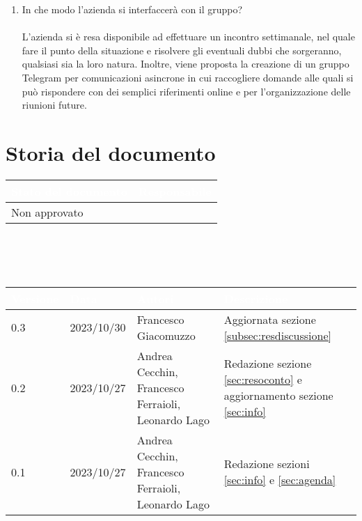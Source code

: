 \documentclass[12pt]{article}
\begin{document}
\begin{enumerate}
    \item In che modo l'azienda si interfaccerà con il gruppo?\\ \\
L'azienda si è resa disponibile ad effettuare un incontro settimanale, nel quale fare il punto della situazione e risolvere gli eventuali dubbi che sorgeranno, qualsiasi sia la loro natura. Inoltre, viene proposta la creazione di un gruppo Telegram per comunicazioni asincrone in cui raccogliere domande alle quali si può rispondere con dei semplici riferimenti online e per l'organizzazione delle riunioni future.

\end{enumerate}

\section{Storia del documento} \label{sec:storia}
\begingroup
\setlength{\tabcolsep}{10pt}
\renewcommand{\arraystretch}{1.5}
\begin{tabularx}{\textwidth}{| X | X |}
    \hline
    \rowcolor{headerrow} \textbf{\textcolor{white}{Stato del documento}} & \textbf{\textcolor{white}{Responsabile}} \\
    \hline
    Non approvato &\\
    \hline   
\end{tabularx}
\\\\\\
\begin{tabularx}{\textwidth}{| l | l | X | X |}
    \hline
    \rowcolor{headerrow} \textbf{\textcolor{white}{Versione}} & \textbf{\textcolor{white}{Data}} & \textbf{\textcolor{white}{Autori}} & \textbf{\textcolor{white}{Descrizione}} \\
    \hline  
    0.3 & 2023/10/30 & Francesco Giacomuzzo  & Aggiornata sezione \ref{subsec:resdiscussione} \\
    \hline
    0.2 & 2023/10/27 & Andrea Cecchin, Francesco Ferraioli, Leonardo Lago & Redazione sezione \ref{sec:resoconto} e aggiornamento sezione \ref{sec:info}\\
    \hline
    0.1 & 2023/10/27 & Andrea Cecchin, Francesco Ferraioli, Leonardo Lago  & Redazione sezioni \ref{sec:info} e \ref{sec:agenda}\\
    \hline   
\end{tabularx}
\endgroup
\end{document}
